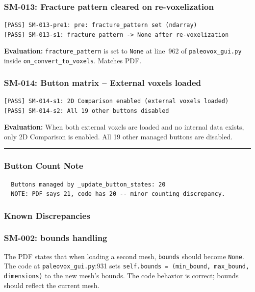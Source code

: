 \documentclass[12pt,a4paper]{article}
\begin{document}
\subsubsection{SM-013: Fracture pattern cleared on re-voxelization}

\begin{lstlisting}
[PASS] SM-013-pre1: pre: fracture_pattern set (ndarray)
[PASS] SM-013-s1: fracture_pattern -> None after re-voxelization
\end{lstlisting}

\textbf{Evaluation:} \texttt{fracture\_pattern} is set to \texttt{None} at
line~962 of \texttt{paleovox\_gui.py} inside \texttt{on\_convert\_to\_voxels}.
Matches PDF.

\subsubsection{SM-014: Button matrix -- External voxels loaded}

\begin{lstlisting}
[PASS] SM-014-s1: 2D Comparison enabled (external voxels loaded)
[PASS] SM-014-s2: All 19 other buttons disabled
\end{lstlisting}

\textbf{Evaluation:} When both external voxels are loaded and no internal data
exists, only 2D Comparison is enabled. All 19 other managed buttons are disabled.

\bigskip
\begin{center}
\rule{0.5\textwidth}{0.4pt}
\end{center}

\subsubsection{Button Count Note}

\begin{lstlisting}
  Buttons managed by _update_button_states: 20
  NOTE: PDF says 21, code has 20 -- minor counting discrepancy.
\end{lstlisting}

\subsubsection{Known Discrepancies}

\subsubsection{SM-002: bounds handling}
The PDF states that when loading a second mesh, \texttt{bounds} should become
\texttt{None}. The code at \texttt{paleovox\_gui.py}:931 sets
\texttt{self.bounds = (min\_bound, max\_bound, dimensions)} to the new mesh's
bounds. The code behavior is correct; bounds should reflect the current mesh.
\end{document}
